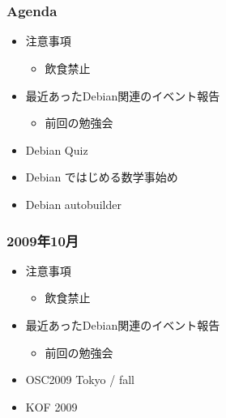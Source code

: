 \frame{\titlepage{}}


\section{}
\begin{frame}
 \frametitle{Agenda}
\begin{minipage}[t]{0.45\hsize}
  \begin{itemize}
  \item 注意事項
	\begin{itemize}
	 \item 飲食禁止
	\end{itemize}
  \item 最近あったDebian関連のイベント報告
	\begin{itemize}
	 \item 前回の勉強会
	\end{itemize}
 \end{itemize}
\end{minipage} 
\begin{minipage}[t]{0.45\hsize}
 \begin{itemize}
  \item Debian Quiz
  \item Debian ではじめる数学事始め
  \item Debian autobuilder
 \end{itemize}
\end{minipage}
\end{frame}


\begin{frame}
 \frametitle{2009年10月}
\begin{minipage}[t]{0.45\hsize}
  \begin{itemize}
  \item 注意事項
	\begin{itemize}
	 \item 飲食禁止
	\end{itemize}
  \item 最近あったDebian関連のイベント報告
	\begin{itemize}
	 \item 前回の勉強会
	\end{itemize}
 \end{itemize}
\end{minipage} 
\begin{minipage}[t]{0.45\hsize}
 \begin{itemize}
  \item OSC2009 Tokyo / fall
  \item KOF 2009
 \end{itemize}
\end{minipage}
\end{frame}

